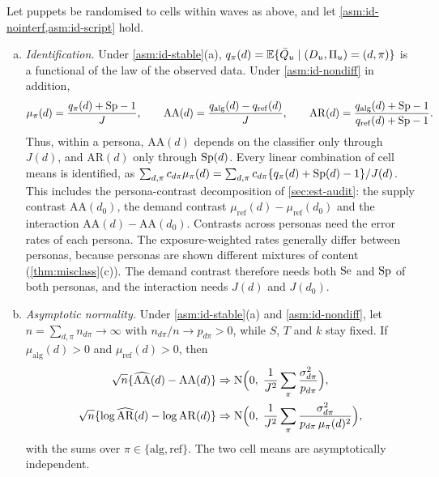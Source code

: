\begin{theorem}\label{thm:identify}
Let puppets be randomised to cells within waves as above, and let \cref{asm:id-nointerf,asm:id-script} hold.
\begin{enumerate}[(a)]
  \item \emph{Identification.} Under \cref{asm:id-stable}(a), $q_\pi(d)=\mathbb{E}\{\bar Q_u\mid(D_u,\Pi_u)=(d,\pi)\}$ is a functional of the law of the observed data. Under \cref{asm:id-nondiff} in addition,
  \begin{equation}\label{eq:id-ident}
    \mu_\pi(d)=\frac{q_\pi(d)+\mathrm{Sp}-1}{J},\qquad
    \mathrm{AA}(d)=\frac{q_{\mathrm{alg}}(d)-q_{\mathrm{ref}}(d)}{J},\qquad
    \mathrm{AR}(d)=\frac{q_{\mathrm{alg}}(d)+\mathrm{Sp}-1}{q_{\mathrm{ref}}(d)+\mathrm{Sp}-1}.
  \end{equation}
  Thus, within a persona, $\mathrm{AA}(d)$ depends on the classifier only through $J(d)$, and $\mathrm{AR}(d)$ only through $\mathrm{Sp}(d)$. Every linear combination of cell means is identified, as $\sum_{d,\pi}c_{d\pi}\mu_\pi(d)=\sum_{d,\pi}c_{d\pi}\{q_\pi(d)+\mathrm{Sp}(d)-1\}/J(d)$. This includes the persona-contrast decomposition of \cref{sec:est-audit}: the supply contrast $\mathrm{AA}(d_0)$, the demand contrast $\mu_{\mathrm{ref}}(d)-\mu_{\mathrm{ref}}(d_0)$ and the interaction $\mathrm{AA}(d)-\mathrm{AA}(d_0)$. Contrasts across personas need the error rates of each persona. The exposure-weighted rates generally differ between personas, because personas are shown different mixtures of content (\cref{thm:misclass}(c)). The demand contrast therefore needs both $\mathrm{Se}$ and $\mathrm{Sp}$ of both personas, and the interaction needs $J(d)$ and $J(d_0)$.
  \item \emph{Asymptotic normality.} Under \cref{asm:id-stable}(a) and \cref{asm:id-nondiff}, let $n=\sum_{d,\pi}n_{d\pi}\to\infty$ with $n_{d\pi}/n\to p_{d\pi}>0$, while $S$, $T$ and $k$ stay fixed. If $\mu_{\mathrm{alg}}(d)>0$ and $\mu_{\mathrm{ref}}(d)>0$, then
  \begin{align*}
    \sqrt n\{\widehat{\mathrm{AA}}(d)-\mathrm{AA}(d)\}&\Rightarrow\mathrm N\Bigl(0,\;\frac{1}{J^2}\sum_{\pi}\frac{\sigma^2_{d\pi}}{p_{d\pi}}\Bigr),\\
    \sqrt n\{\log\widehat{\mathrm{AR}}(d)-\log\mathrm{AR}(d)\}&\Rightarrow\mathrm N\Bigl(0,\;\frac{1}{J^2}\sum_{\pi}\frac{\sigma^2_{d\pi}}{p_{d\pi}\,\mu_\pi(d)^2}\Bigr),
  \end{align*}
  with the sums over $\pi\in\{\mathrm{alg},\mathrm{ref}\}$. The two cell means are asymptotically independent.

\end{enumerate}
\end{theorem}
